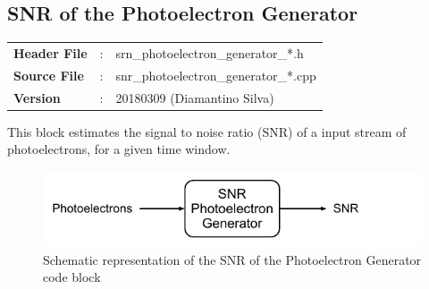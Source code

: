 \clearpage

\begin{refsection}

\section{SNR of the Photoelectron Generator}

\begin{tcolorbox}	
\begin{tabular}{p{2.75cm} p{0.2cm} p{10.5cm}} 	
\textbf{Header File}   &:& srn\_photoelectron\_generator\_*.h \\
\textbf{Source File}   &:& snr\_photoelectron\_generator\_*.cpp \\
\textbf{Version}       &:& 20180309 (Diamantino Silva)
\end{tabular}
\end{tcolorbox}

\vspace{1em}
%
This block estimates the signal to noise ratio (SNR) of a input stream of photoelectrons, for a given time window.
%
\begin{figure}[h]
	\centering
	\includegraphics{./lib/snr_photoelectron_generator/figures/snr_photoelectron_generator_scheme.pdf}
	\caption{Schematic representation of the SNR of the Photoelectron Generator code block}
\end{figure}


\end{refsection}
